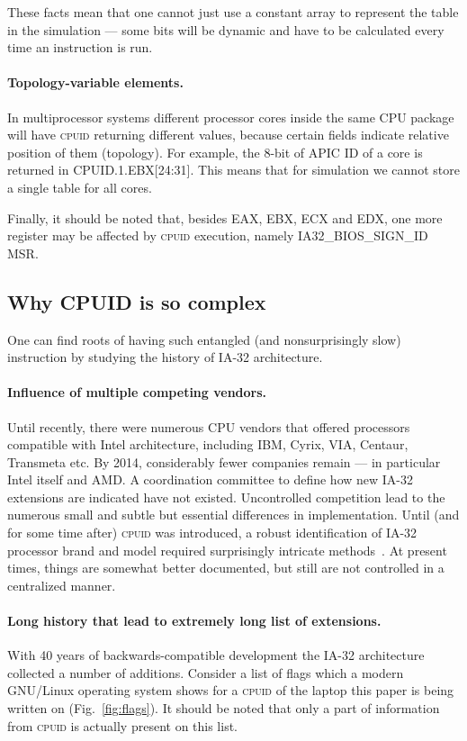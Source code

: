 \documentclass[a4paper,10pt,oneside,unicode]{article}
\newcommand{\cpuid}{\textsc{cpuid} }
\begin{document}
These facts mean that one cannot just use a constant array to represent the table in the simulation --- some bits will be dynamic and have to be calculated every time an instruction is run.

\paragraph{Topology-variable elements.} In multiprocessor systems different processor cores inside the same CPU package will have \cpuid returning different values, because certain fields indicate relative position of them (topology). For example, the 8-bit of APIC ID of a core is returned in CPUID.1.EBX[24:31]. This means that for simulation we cannot store a single table for all cores.

Finally, it should be noted that, besides EAX, EBX, ECX and EDX, one more register may be affected by \cpuid execution, namely IA32\_BIOS\_SIGN\_ID MSR.

\subsection{Why CPUID is so complex}

One can find roots of having such entangled (and nonsurprisingly slow) instruction by studying the history of IA-32 architecture.
\paragraph{Influence of multiple competing vendors.} Until recently, there were numerous {CPU} vendors that offered processors compatible with Intel architecture, including IBM, Cyrix, VIA, Centaur, Transmeta etc. By 2014, considerably fewer companies remain --- in particular Intel itself and AMD. A coordination committee to define how new IA-32 extensions are indicated have not existed. Uncontrolled competition lead to the numerous small and subtle but essential differences in implementation. 
Until (and for some time after) \cpuid was introduced, a robust identification of IA-32 processor brand and model required surprisingly intricate methods~\cite{cpuid-wars}. At present times, things are somewhat better documented, but still are not controlled in a centralized manner.

\paragraph{Long history that lead to extremely long list of extensions.} With 40 years of backwards-compatible development the IA-32 architecture collected a number of additions. Consider a list of flags which a modern GNU/Linux operating system shows for a \cpuid of the laptop this paper is being written on (Fig.~\ref{fig:flags}). It should be noted that only a part of information from \cpuid is actually present on this list.
\end{document}
